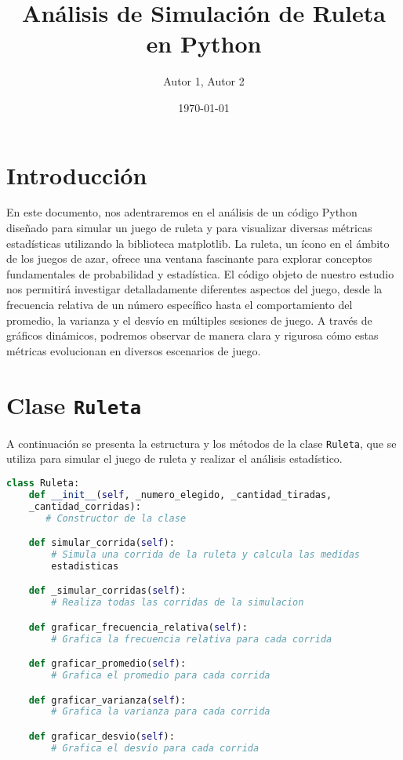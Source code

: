 \documentclass{article}
\begin{document}
\title{Análisis de Simulación de Ruleta en Python}
\author{Autor 1, Autor 2}
\date{\today}

\maketitle

\section{Introducción}

En este documento, nos adentraremos en el análisis de un código Python diseñado para simular un juego de ruleta y para visualizar diversas métricas estadísticas utilizando la biblioteca matplotlib. La ruleta, un ícono en el ámbito de los juegos de azar, ofrece una ventana fascinante para explorar conceptos fundamentales de probabilidad y estadística. El código objeto de nuestro estudio nos permitirá investigar detalladamente diferentes aspectos del juego, desde la frecuencia relativa de un número específico hasta el comportamiento del promedio, la varianza y el desvío en múltiples sesiones de juego. A través de gráficos dinámicos, podremos observar de manera clara y rigurosa cómo estas métricas evolucionan en diversos escenarios de juego.

\section{Clase \texttt{Ruleta}}

A continuación se presenta la estructura y los métodos de la clase \texttt{Ruleta}, que se utiliza para simular el juego de ruleta y realizar el análisis estadístico.

\begin{lstlisting}[language=Python,caption={Estructura y métodos de la clase Ruleta}]
class Ruleta:
    def __init__(self, _numero_elegido, _cantidad_tiradas,
    _cantidad_corridas):
       # Constructor de la clase

    def simular_corrida(self):
        # Simula una corrida de la ruleta y calcula las medidas
        estadisticas

    def _simular_corridas(self):
        # Realiza todas las corridas de la simulacion

    def graficar_frecuencia_relativa(self):
        # Grafica la frecuencia relativa para cada corrida

    def graficar_promedio(self):
        # Grafica el promedio para cada corrida

    def graficar_varianza(self):
        # Grafica la varianza para cada corrida

    def graficar_desvio(self):
        # Grafica el desvío para cada corrida
\end{lstlisting}
\end{document}
